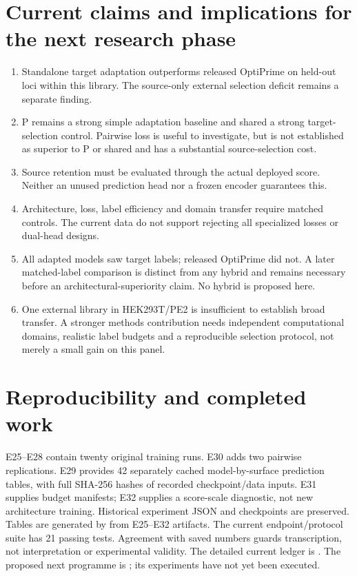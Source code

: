 \documentclass[11pt]{article}
\begin{document}
\section{Current claims and implications for the next research phase}
\begin{enumerate}
\item Standalone target adaptation outperforms released OptiPrime on held-out loci within
this library. The source-only external selection deficit remains a separate finding.
\item P remains a strong simple adaptation baseline and shared a strong target-selection
control. Pairwise loss is useful to investigate, but is not established as superior to P
or shared and has a substantial source-selection cost.
\item Source retention must be evaluated through the actual deployed score. Neither an
unused prediction head nor a frozen encoder guarantees this.
\item Architecture, loss, label efficiency and domain transfer require matched controls.
The current data do not support rejecting all specialized losses or dual-head designs.
\item All adapted models saw target labels; released OptiPrime did not. A later
matched-label comparison is distinct from any hybrid and remains necessary before an
architectural-superiority claim. No hybrid is proposed here.
\item One external library in HEK293T/PE2 is insufficient to establish broad transfer.
A stronger methods contribution needs independent computational domains, realistic
label budgets and a reproducible selection protocol, not merely a small gain on this panel.
\end{enumerate}

\section*{Reproducibility and completed work}
E25--E28 contain twenty original training runs. E30 adds two pairwise replications.
E29 provides 42 separately cached model-by-surface prediction tables, with full SHA-256
hashes of recorded checkpoint/data inputs. E31 supplies budget manifests; E32 supplies a
score-scale diagnostic, not new architecture training. Historical experiment JSON and
checkpoints are preserved. Tables are generated by
 from E25--E32 artifacts.
The current endpoint/protocol suite has 21 passing tests.
Agreement with saved numbers guards transcription, not interpretation or experimental validity.
The detailed current ledger is .
The proposed next programme is ; its experiments
have not yet been executed.
\end{document}

